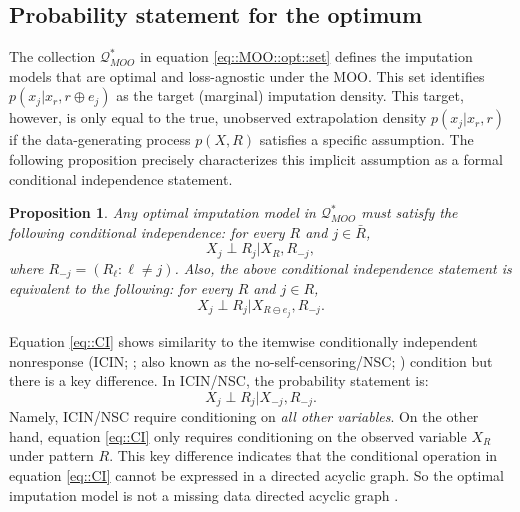 \documentclass[aos, preprint]{imsart}
\theoremstyle{plain}
\newtheorem{proposition}[theorem]{Proposition}
\theoremstyle{definition}
\begin{document}
\subsection{Probability statement for the optimum}


The collection $\mathcal{Q}^*_{MOO}$ in equation \eqref{eq::MOO::opt::set} defines the imputation models that are optimal and loss-agnostic under the MOO. This set identifies $p(x_j|x_r, r\oplus e_j)$ as the target (marginal) imputation density. This target, however, is only equal to the true, unobserved extrapolation density $p(x_j|x_r, r)$ if the data-generating process $p(X,R)$ satisfies a specific assumption. The following proposition precisely characterizes this implicit assumption as a formal conditional independence statement.


\begin{proposition}
\label{prop::prob}
Any optimal imputation model in $\mathcal{Q}^*_{MOO}$ must satisfy the following conditional independence:
for  every $R$ and $j \in {\bar R }$,
\begin{equation}
X_j \perp R_j | X_{R}, R_{-j},
\label{eq::CI}
\end{equation}
where $R_{-j} = (R_\ell: \ell \neq j)$.
Also, the above conditional independence statement is equivalent to the following:
for  every $R$ and $j \in { R }$,
\begin{equation}
X_j \perp R_j | X_{R\ominus e_j}, R_{-j}.
\label{eq::CI2}
\end{equation}

\end{proposition}




Equation \eqref{eq::CI} shows similarity to the itemwise conditionally independent nonresponse (ICIN; \citealt{sadinle2017itemwise}; also known
as the no-self-censoring/NSC; \citealt{malinsky2022semiparametric}) condition
but there is a key difference. In ICIN/NSC, the probability statement is:
$$
X_j \perp R_j | X_{-j}, R_{-j}.
$$
Namely, ICIN/NSC require conditioning on \emph{all other variables}.
On the other hand, equation \eqref{eq::CI} only requires
conditioning on the observed variable $X_R$ under pattern $R$.
This key difference indicates that the conditional operation in equation \eqref{eq::CI}
cannot be expressed in a directed acyclic graph. 
So the optimal imputation model is not a missing data directed acyclic graph \citep{mohan2013graphical, nabi2020full}.
\end{document}
